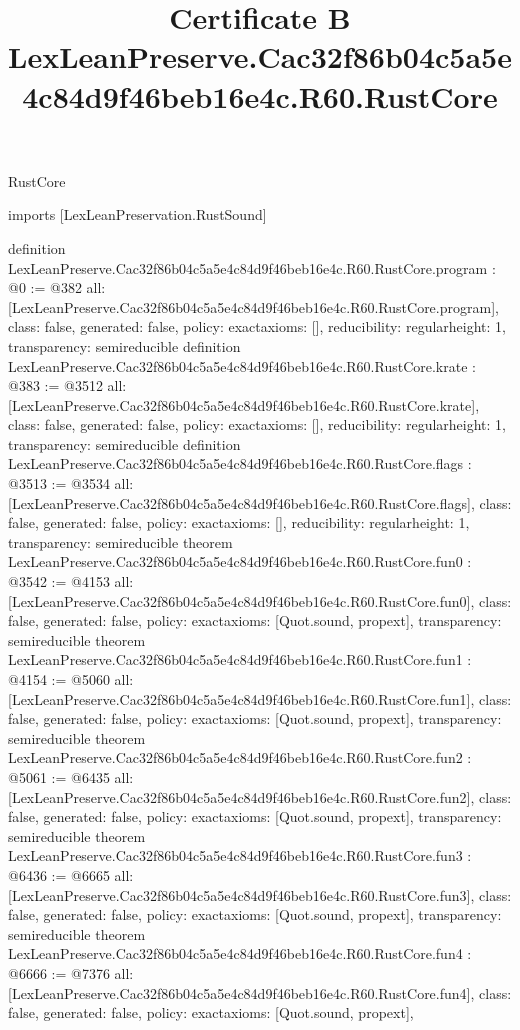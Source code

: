 \begin{lexlean}{RustCore}
\title{Certificate B LexLeanPreserve.Cac32f86b04c5a5e4c84d9f46beb16e4c.R60.RustCore}
\begin{coremodule}
imports [LexLeanPreservation.RustSound]

definition LexLeanPreserve.Cac32f86b04c5a5e4c84d9f46beb16e4c.R60.RustCore.program : @0 := @382 {
  all: [LexLeanPreserve.Cac32f86b04c5a5e4c84d9f46beb16e4c.R60.RustCore.program],
  class: false,
  generated: false,
  policy: exact{axioms: []},
  reducibility: regular{height: 1},
  transparency: semireducible
}
definition LexLeanPreserve.Cac32f86b04c5a5e4c84d9f46beb16e4c.R60.RustCore.krate : @383 := @3512 {
  all: [LexLeanPreserve.Cac32f86b04c5a5e4c84d9f46beb16e4c.R60.RustCore.krate],
  class: false,
  generated: false,
  policy: exact{axioms: []},
  reducibility: regular{height: 1},
  transparency: semireducible
}
definition LexLeanPreserve.Cac32f86b04c5a5e4c84d9f46beb16e4c.R60.RustCore.flags : @3513 := @3534 {
  all: [LexLeanPreserve.Cac32f86b04c5a5e4c84d9f46beb16e4c.R60.RustCore.flags],
  class: false,
  generated: false,
  policy: exact{axioms: []},
  reducibility: regular{height: 1},
  transparency: semireducible
}
theorem LexLeanPreserve.Cac32f86b04c5a5e4c84d9f46beb16e4c.R60.RustCore.fun0 : @3542 := @4153 {
  all: [LexLeanPreserve.Cac32f86b04c5a5e4c84d9f46beb16e4c.R60.RustCore.fun0],
  class: false,
  generated: false,
  policy: exact{axioms: [Quot.sound, propext]},
  transparency: semireducible
}
theorem LexLeanPreserve.Cac32f86b04c5a5e4c84d9f46beb16e4c.R60.RustCore.fun1 : @4154 := @5060 {
  all: [LexLeanPreserve.Cac32f86b04c5a5e4c84d9f46beb16e4c.R60.RustCore.fun1],
  class: false,
  generated: false,
  policy: exact{axioms: [Quot.sound, propext]},
  transparency: semireducible
}
theorem LexLeanPreserve.Cac32f86b04c5a5e4c84d9f46beb16e4c.R60.RustCore.fun2 : @5061 := @6435 {
  all: [LexLeanPreserve.Cac32f86b04c5a5e4c84d9f46beb16e4c.R60.RustCore.fun2],
  class: false,
  generated: false,
  policy: exact{axioms: [Quot.sound, propext]},
  transparency: semireducible
}
theorem LexLeanPreserve.Cac32f86b04c5a5e4c84d9f46beb16e4c.R60.RustCore.fun3 : @6436 := @6665 {
  all: [LexLeanPreserve.Cac32f86b04c5a5e4c84d9f46beb16e4c.R60.RustCore.fun3],
  class: false,
  generated: false,
  policy: exact{axioms: [Quot.sound, propext]},
  transparency: semireducible
}
theorem LexLeanPreserve.Cac32f86b04c5a5e4c84d9f46beb16e4c.R60.RustCore.fun4 : @6666 := @7376 {
  all: [LexLeanPreserve.Cac32f86b04c5a5e4c84d9f46beb16e4c.R60.RustCore.fun4],
  class: false,
  generated: false,
  policy: exact{axioms: [Quot.sound, propext]},
}
\end{coremodule}
\end{lexlean}
